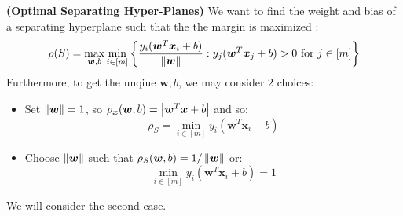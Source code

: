 \begin{definition}{\textbf{(Optimal Separating Hyper-Planes)}}
    We want to find the weight and bias of a separating hyperplane such that the the margin is maximized :
    \begin{equation*}
        \rho(S) = \max_{\boldsymbol w, b}\min_{i\in[m]}\left\{ \frac{y_i(\boldsymbol w^T\boldsymbol x_i + b)}{\left\lVert\boldsymbol w\right\rVert} : y_j (\boldsymbol w^T\boldsymbol x_j + b) > 0 \text{ for } j \in [m]  \right\}
    \end{equation*}
    Furthermore, to get the unqiue $\boldsymbol w, b$, we may consider $2$ choices:
    \begin{itemize}
        \item Set $\left\lVert\boldsymbol w\right\rVert = 1$, so $\rho_{\boldsymbol x}(\boldsymbol w, b) = \left| \boldsymbol w^T\boldsymbol x + b \right|$ and so:
        \begin{equation*}
            \rho_S = \min_{i\in[m]}y_i(\boldsymbol w^T\boldsymbol x_i + b)
        \end{equation*}
        \item Choose $\left\lVert\boldsymbol w\right\rVert$ such that $\rho_S(\boldsymbol w, b) = 1/\left\lVert\boldsymbol w\right\rVert$ or:
        \begin{equation*}
            \min_{i\in[m]} y_i(\boldsymbol w^T\boldsymbol x_i + b) = 1
        \end{equation*}
    \end{itemize}
    We will consider the second case.
\end{definition}

